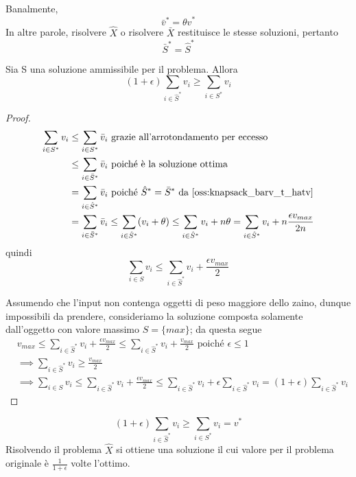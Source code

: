 \begin{oss} \label{oss:knapsack_barv_t_hatv}
	Banalmente,
	$$
		\bar{v}^* = \theta \hat{v}^*
	$$
	In altre parole, risolvere $\hat{X}$ o risolvere $\bar{X}$ restituisce le
	stesse soluzioni, pertanto
	$$
		\bar{S}^* = \hat{S}^*
	$$

\end{oss}

\begin{lemma}
	Sia S una soluzione ammissibile per il problema. Allora
	$$
		(1+\epsilon)\sum_{i \in \hat{S}^*} v_i \geq \sum_{i \in S^*} v_i
	$$
\end{lemma}
\begin{proof}
	\begin{align*}
		 \sum_{i \in S^*} v_i & \leq \sum_{i \in S^*} \bar{v}_i  \text{ grazie all'arrotondamento per eccesso}                      \\
		 & \leq \sum_{ i \in \bar{S}^*} \bar{v}_i  \text{ poiché è la soluzione ottima}                                         \\
		 & = \sum_{ i \in \hat{S}^*} \bar{v}_i \text{ poiché } \hat{S}^* = \bar{S}^* \text{ da \cref{oss:knapsack_barv_t_hatv}} \\
		 & = \sum_{i \in \bar{S}^*} \bar{v}_i \leq \sum_{i \in \hat{S}^*} (v_i + \theta) \leq
		\sum_{i \in \hat{S}^*} v_i + n \theta = \sum_{i \in \hat{S}^*} v_i + n \frac{\epsilon v_{max}}{2 n}
	\end{align*}
	quindi
	$$
		\sum_{i \in S} v_i  \leq \sum_{i \in \hat{S}^*} v_i + \frac{\epsilon v_{max}}{2}
	$$

	Assumendo che l'input non contenga oggetti di peso maggiore dello zaino,
	dunque impossibili da prendere, consideriamo la soluzione composta
	solamente dall'oggetto con valore massimo $S = \{max\}$;
	da questa segue
	\begin{align*}
		 & v_{max} \leq \sum_{i \in \hat{S}^*} v_i + \frac{\epsilon v_{max}}{2}
		\leq \sum_{i \in \hat{S}^*} v_i + \frac{v_{max}}{2} \text{ poiché } \epsilon \leq 1         \\
		 & \implies \sum_{i \in \hat{S}^*} v_i \geq \frac{v_{max}}{2}                               \\
		 & \implies \sum_{i \in S} v_i \leq \sum_{i \in \hat{S}^*} v_i + \frac{\epsilon v_{max}}{2}
		\leq \sum_{i \in \hat{S}^*}v_i + \epsilon \sum_{i \in \hat{S}^*} v_i = (1 + \epsilon) \sum_{i \in \hat{S}^*} v_i
	\end{align*}
\end{proof}
\begin{theorem}
	$$
		(1+\epsilon)\sum_{i \in \hat{S}^*} v_i \geq \sum_{i \in S^*} v_i = v^*
	$$
	Risolvendo il problema $\hat{X}$ si ottiene una soluzione il cui valore
	per il problema originale è
	$\frac{1}{1+\epsilon}$
	volte l'ottimo.
\end{theorem}

